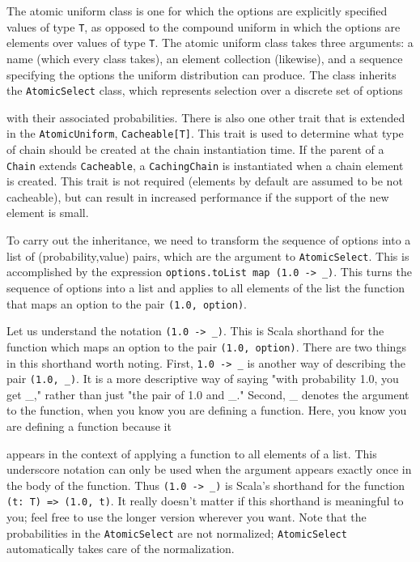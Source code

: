 The atomic uniform class is one for which the options are explicitly specified values of type \texttt{T}, as opposed to the compound uniform in which the options are elements over values of type \texttt{T}. The atomic uniform class takes three arguments: a name (which every class takes), an element collection (likewise), and a sequence specifying the options the uniform distribution can produce. The class inherits the \texttt{AtomicSelect} class, which represents selection over a discrete set of options

with their associated probabilities. There is also one other trait that is extended in the \texttt{AtomicUniform},
\texttt{Cacheable[T]}. This trait is used to determine what type of chain should be created at the chain instantiation time. If the parent of a \texttt{Chain} extends \texttt{Cacheable}, a \texttt{CachingChain} is instantiated when a chain element is created. This trait is not required (elements by default are assumed to be not cacheable), but can result in increased performance if the support of the new element is small.

To carry out the inheritance, we need to transform the sequence of options into a list of (probability,value) pairs, which are the argument to \texttt{AtomicSelect}. This is accomplished by the expression \texttt{options.toList map (1.0 -> \_)}. This turns the sequence of options into a list and applies to all elements of the list the function that maps an option to the pair \texttt{(1.0, option)}.

Let us understand the notation \texttt{(1.0 -> \_)}. This is Scala shorthand for the function which maps an option to the pair \texttt{(1.0, option)}. There are two things in this shorthand worth noting. First, \texttt{1.0 -> \_} is another way of describing the pair \texttt{(1.0, \_)}.   It is a more descriptive way of saying "with probability 1.0, you get \_," rather than just "the pair of 1.0 and \_."   Second, \_ denotes the argument to the function, when you know
you are defining a function. Here, you know you are defining a function because it
 
appears in the context of applying a function to all elements of a list. This underscore notation can only be used when the argument appears exactly once in the body of the function. Thus \texttt{(1.0 -> \_)} is Scala's shorthand for the function \texttt{(t: T) => (1.0, t)}. It really doesn't matter if this shorthand is meaningful to you; feel free to use the longer version wherever you want. Note that the probabilities in the \texttt{AtomicSelect} are not normalized; \texttt{AtomicSelect} automatically takes care of the normalization.

